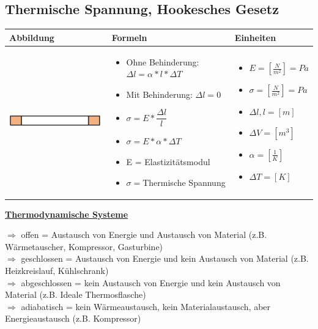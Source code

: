 \subsection{Thermische Spannung, Hookesches Gesetz}				%
\begin{table}[h!]
	\begin{tabular}{ | m{6cm} | m{8cm} | m{4cm} | }
		\hline
		Abbildung & Formeln & Einheiten \\ \hline
		\midrule
		\begin{minipage}{.3\textwidth}
			\includegraphics[width=6.0cm]{Figures/Spannung}
		\end{minipage}
		&
		\begin{itemize}
			\item Ohne Behinderung: $\Delta l=\alpha*l*\Delta T$	
			\item Mit Behinderung: $\Delta l=0$	
			\item $\sigma=E*\dfrac{\Delta l}{l}$
			\item $\sigma=E*\alpha*\Delta T$
			\item E = Elastizitätsmodul
			\item $\sigma=$Thermische Spannung
		\end{itemize}
		& 
		\begin{itemize}
			\item $E= [\frac{N}{m^{2}}]=Pa$
			\item $\sigma=[\frac{N}{m^{2}}]=Pa$
			\item $\Delta l,l= [m]$
			\item $\Delta V=[m^3]$
			\item $\alpha=[\frac{1}{K}]$	
			\item $\Delta T=[K]$
		\end{itemize}
		\\ \hline
	\end{tabular}
\end{table}
\uline{\textbf{Thermodynamische Systeme}}

	$\Rightarrow$ offen = Austausch von Energie und Austausch von Material (z.B. Wärmetauscher, Kompressor, Gasturbine)\\
	$\Rightarrow$ geschlossen = Austausch von Energie und kein Austausch von Material (z.B. Heizkreislauf, Kühlschrank)\\
	$\Rightarrow$ abgeschlossen = kein Austausch von Energie und kein Austausch von Material (z.B. Ideale Thermosflasche)\\ 	
	$\Rightarrow$ adiabatisch = kein Wärmeaustausch, kein Materialaustausch, aber Energieaustausch (z.B. Kompressor)\\

